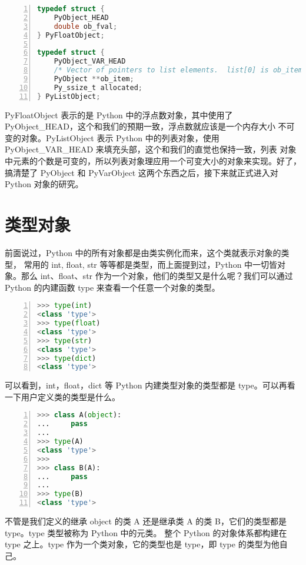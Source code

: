 \begin{lstlisting}[language=C, numbers=left, numbersep=1em, numberstyle=\footnotesize , breaklines=true]
typedef struct {
    PyObject_HEAD
    double ob_fval;
} PyFloatObject;

typedef struct {
    PyObject_VAR_HEAD
    /* Vector of pointers to list elements.  list[0] is ob_item[0], etc. */
    PyObject **ob_item;
    Py_ssize_t allocated;
} PyListObject;
\end{lstlisting}

PyFloatObject 表示的是 Python 中的浮点数对象，其中使用了 PyObject\_HEAD，这个和我们的预期一致，浮点数就应该是一个内存大小
不可变的对象。PyListObject 表示 Python 中的列表对象，使用 PyObject\_VAR\_HEAD 来填充头部，这个和我们的直觉也保持一致，列表
对象中元素的个数是可变的，所以列表对象理应用一个可变大小的对象来实现。好了，搞清楚了 PyObject 和 PyVarObject 这两个东西之后，接下来就正式进入对 Python 对象的研究。

\section{类型对象}

前面说过，Python 中的所有对象都是由类实例化而来，这个类就表示对象的类型， 常用的 int, float, str 等等都是类型，而上面提到过，Python 中一切皆对象。那么 int、float、str 作为一个对象，他们的类型又是什么呢？我们可以通过 Python 的内建函数 type 来查看一个任意一个对象的类型。

\begin{lstlisting}[language=Python, numbers=left, numbersep=1em, numberstyle=\footnotesize , breaklines=true]
>>> type(int)
<class 'type'>
>>> type(float)
<class 'type'>
>>> type(str)
<class 'type'>
>>> type(dict)
<class 'type'>
\end{lstlisting}

可以看到，int，float，dict 等 Python 内建类型对象的类型都是 type。可以再看一下用户定义类的类型是什么。

\begin{lstlisting}[language=Python, numbers=left, numbersep=1em, numberstyle=\footnotesize , breaklines=true]
>>> class A(object):
...     pass
...
>>> type(A)
<class 'type'>
>>>
>>> class B(A):
...     pass
...
>>> type(B)
<class 'type'>
\end{lstlisting}

不管是我们定义的继承 object 的类 A 还是继承类 A 的类 B，它们的类型都是 type。type 类型被称为 Python 中的元类。
整个 Python 的对象体系都构建在 type 之上。type 作为一个类对象，它的类型也是 type，即 type 的类型为他自己。


